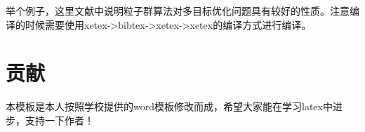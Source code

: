 \documentclass{suesreport}
\begin{document}
    举个例子，这里文献\cite{2004PSO_ZhangLibiao}中说明粒子群算法对多目标优化问题具有较好的性质。注意编译的时候需要使用xetex->bibtex->xetex->xetex的编译方式进行编译。
    \section{贡献}
    本模板是本人按照学校提供的word模板修改而成，希望大家能在学习latex中进步，支持一下作者！

    
    \nocite{*} 
    
\end{document}
